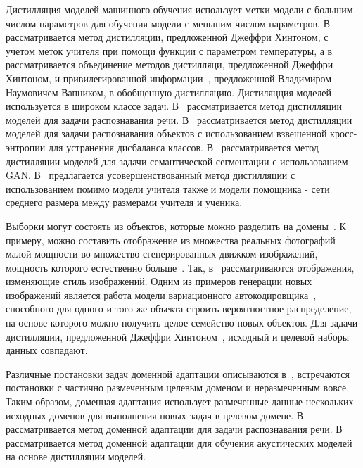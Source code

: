 Дистилляция моделей машинного обучения использует метки модели с большим числом параметров для обучения модели с меньшим числом параметров. В~\cite{Hinton2015} рассматривается метод дистилляции, предложенной Джеффри Хинтоном, с учетом меток учителя при помощи функции  с параметром температуры, а в~\cite{Vapnik2016} рассматривается объединение методов дистилляци, предложенной Джеффри Хинтоном, и привилегированной информации~\cite{Vapnik2016}, предложенной Владимиром Наумовичем Вапником, в обобщенную дистилляцию. Дистиляцция моделей используется в широком классе задач. В~\cite{MDASR} рассматривается метод дистилляции моделей для задачи распознавания речи. В~\cite{Object Detection} рассматривается метод дистилляции моделей для задачи распознавания объектов с использованием взвешенной кросс-энтропии для устранения дисбаланса классов. В~\cite{Semantic Segmentation} рассматривается метод дистилляции моделей для задачи семантической сегментации с использованием GAN. В~\cite{Improved Distillation} предлагается усовершенствованный метод дистилляции с использованием помимо модели учителя также и модели помощника - сети среднего размера между размерами учителя и ученика.

Выборки могут состоять из объектов, которые можно разделить на домены~\cite{image_to_image, DA via prompt learning}. К примеру, можно составить отображение из множества реальных фотографий малой мощности во множество сгенерированных движком изображений, мощность которого естественно больше~\cite{DA,UDA}. Так, в~\cite{image_to_image, Transfer Learning} рассматриваются отображения, изменяющие стиль изображений. Одним из примеров генерации новых изображений является работа модели вариационного автокодировщика~\cite{VAE}, способного для одного и того же объекта строить вероятностное распределение, на основе которого можно получить целое семейство новых объектов. Для задачи дистилляции, предложенной Джеффри Хинтоном~\cite{Hinton2015}, исходный и целевой наборы данных совпадают.
 
Различные постановки задач доменной адаптации описываются в~\cite{DeepvisDA}, встречаются постановки с частично размеченным целевым доменом и неразмеченным вовсе. Таким образом, доменная адаптация использует размеченные данные нескольких исходных доменов для выполнения новых задач в целевом домене.
В~\cite{MDASR} рассматривается метод доменной адаптации для задачи распознавания речи. В~\cite{Acoustic Models} рассматривается метод доменной адаптации для обучения акустических моделей на основе дистилляции моделей.
 
